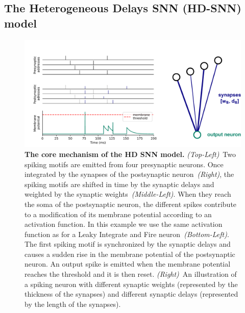 \documentclass[default]{sn-jnl}%
\theoremstyle{thmstyleone}%
\theoremstyle{thmstyletwo}%
\theoremstyle{thmstylethree}%
\begin{document}
\subsection{The Heterogeneous Delays SNN (HD-SNN) model}
%
\begin{figure}%
    \centering
    \includegraphics[width=0.980\linewidth]{figures/HDSNN_graph.pdf}
    \caption{\textbf{The core mechanism of the HD SNN model.} \textit{(Top-Left)}~Two spiking motifs are emitted from four presynaptic neurons. Once integrated by the synapses of the postsynaptic neuron~\textit{(Right)}, the spiking motifs are shifted in time by the synaptic delays and weighted by the synaptic weights~\textit{(Middle-Left)}. When they reach the soma of the postsynaptic neuron, the different spikes contribute to a modification of its membrane potential according to an activation function. In this example we use the same activation function as for a Leaky Integrate and Fire neuron~\textit{(Bottom-Left)}. The first spiking motif is synchronized by the synaptic delays and causes a sudden rise in the membrane potential of the postsynaptic neuron. An output spike is emitted when the membrane potential reaches the threshold and it is then reset.   \textit{(Right)}~An illustration of a spiking neuron with different synaptic weights (represented by the thickness of the synapses) and different synaptic delays (represented by the length of the synapses). }%
    \label{fig:izhikevich}%
\end{figure}%
% 
\end{document}
